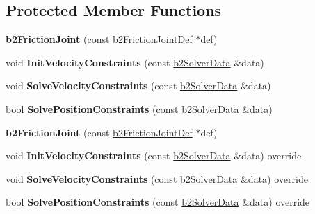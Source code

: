 \subsection*{Protected Member Functions}
\begin{DoxyCompactItemize}
\item 
\mbox{\label{classb2FrictionJoint_a7413c5f289257f0e993b7e750fe95b99}} 
{\bfseries b2\+Friction\+Joint} (const \hyperlink{structb2FrictionJointDef}{b2\+Friction\+Joint\+Def} $\ast$def)
\item 
\mbox{\label{classb2FrictionJoint_a72fbe2a2dce2c90e1b68395e715e1254}} 
void {\bfseries Init\+Velocity\+Constraints} (const \hyperlink{structb2SolverData}{b2\+Solver\+Data} \&data)
\item 
\mbox{\label{classb2FrictionJoint_a5aab459109e198a75e0151f36d50ee65}} 
void {\bfseries Solve\+Velocity\+Constraints} (const \hyperlink{structb2SolverData}{b2\+Solver\+Data} \&data)
\item 
\mbox{\label{classb2FrictionJoint_ac1998353c72787b6074b2ef50dd1c2d2}} 
bool {\bfseries Solve\+Position\+Constraints} (const \hyperlink{structb2SolverData}{b2\+Solver\+Data} \&data)
\item 
\mbox{\label{classb2FrictionJoint_a7413c5f289257f0e993b7e750fe95b99}} 
{\bfseries b2\+Friction\+Joint} (const \hyperlink{structb2FrictionJointDef}{b2\+Friction\+Joint\+Def} $\ast$def)
\item 
\mbox{\label{classb2FrictionJoint_afce4006666e83c50d2017b5ff5e7ca2d}} 
void {\bfseries Init\+Velocity\+Constraints} (const \hyperlink{structb2SolverData}{b2\+Solver\+Data} \&data) override
\item 
\mbox{\label{classb2FrictionJoint_a49109c1785d949e99a809a8c297abf13}} 
void {\bfseries Solve\+Velocity\+Constraints} (const \hyperlink{structb2SolverData}{b2\+Solver\+Data} \&data) override
\item 
\mbox{\label{classb2FrictionJoint_a4e4b64b634299136bc2c7096d5c28aa8}} 
bool {\bfseries Solve\+Position\+Constraints} (const \hyperlink{structb2SolverData}{b2\+Solver\+Data} \&data) override
\end{DoxyCompactItemize}
